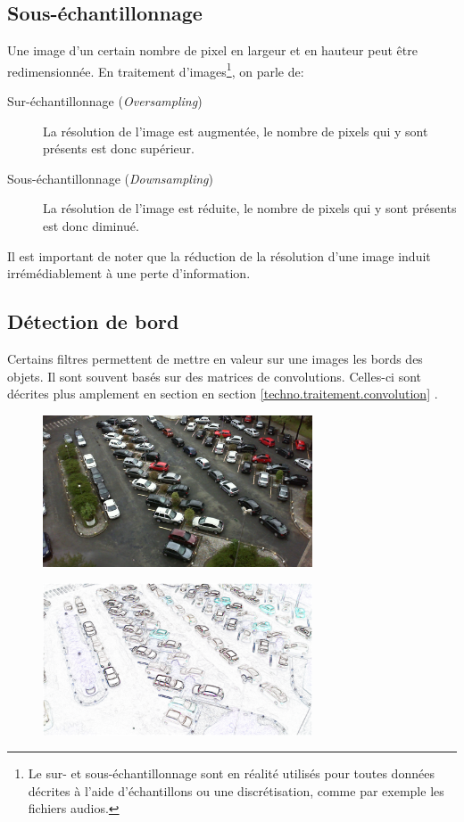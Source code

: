 \subsection{Sous-échantillonnage}
Une image d'un certain nombre de pixel en largeur et en hauteur peut être redimensionnée. En traitement d'images\footnote{Le sur- et sous-échantillonnage sont en réalité utilisés pour toutes données décrites à l'aide d'échantillons ou une discrétisation, comme par exemple les fichiers audios.}, on parle de:
\begin{description}
    \item[Sur-échantillonnage (\textit{Oversampling})] La résolution de l'image est augmentée, le nombre de pixels qui y sont présents est donc supérieur. 
    \item[Sous-échantillonnage (\textit{Downsampling})] La résolution de l'image est réduite, le nombre de pixels qui y sont présents est donc diminué. 
\end{description}

Il est important de noter que la réduction de la résolution d'une image induit irrémédiablement à une perte d'information. 


\subsection{Détection de bord}\label{techno.traitement.bord}
Certains filtres permettent de mettre en valeur sur une images les bords des objets. Il sont souvent basés sur des matrices de convolutions. Celles-ci sont décrites plus amplement en section en section \ref{techno.traitement.convolution} . 

\begin{figure}[ht]
    \includegraphics[width=80mm]{img/conception/pklot_park.jpg}
    \centering
\end{figure}

\begin{figure}[ht]
    \includegraphics[width=80mm]{img/conception/image_process/downsample-edge/4.png}
    \centering
\end{figure}

